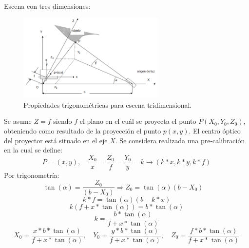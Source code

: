 Escena con tres dimensiones:

\begin{figure}[H]
  \centering
    \includegraphics[width=0.65\textwidth]{./Cap2_videomapping/triangulacion-2.PNG}
  \caption{Propiedades trigonométricas para escena tridimensional.}
  \label{fig:Triangulacion2}
\end{figure}

Se asume $Z = f$ siendo $f$ el plano en el cuál se proyecta el punto $P(X_0, Y_0, Z_0)$, obteniendo como resultado de la proyección el punto $p(x,y)$.
El centro óptico del proyector está situado en el eje $X$.
Se considera realizada una pre-calibración en la cual se define:
\[
P = (x,y), \quad \frac{X_0}{x} = \frac{Z_0}{f} = \frac{Y_0}{y} = k \to (k * x,k * y,k * f)
\]
Por trigonometría:
\[
\tan (\alpha) = \frac{Z_0}{(b - X_0)} \Rightarrow Z_0 = \tan (\alpha) (b - X_0) \quad 
\]
\[
k * f = \tan (\alpha)(b - k * x)
\]
\[
k (f + x * \tan (\alpha)) = b * \tan (\alpha)
\]
\[
k = \frac	{b * \tan (\alpha)}{f + x * \tan (\alpha)}
\]
\[
X_0 = \frac{x * b * \tan (\alpha)}{f + x * \tan (\alpha)}, \quad Y_0 = \frac{y * b * \tan (\alpha)}{f + x * \tan (\alpha)},\quad Z_0 = \frac{f * b * \tan (\alpha)}{f + x * \tan (\alpha)}
\]
